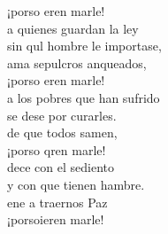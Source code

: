 \begin{cancion}
	¡porso eren marle!\\
	a quienes guardan la ley\\
	sin qul hombre le importase,\\
	ama sepulcros anqueados,\\
	¡porso eren marle!\\
	a los pobres que han sufrido\\
	se dese por curarles.\\
	de que todos samen,\\
	¡porso qren marle!\\
	dece con el sediento\\
	y con  que tienen hambre.\\
	ene a traernos  Paz\\
	¡porsoieren marle!\\
\end{cancion}%
